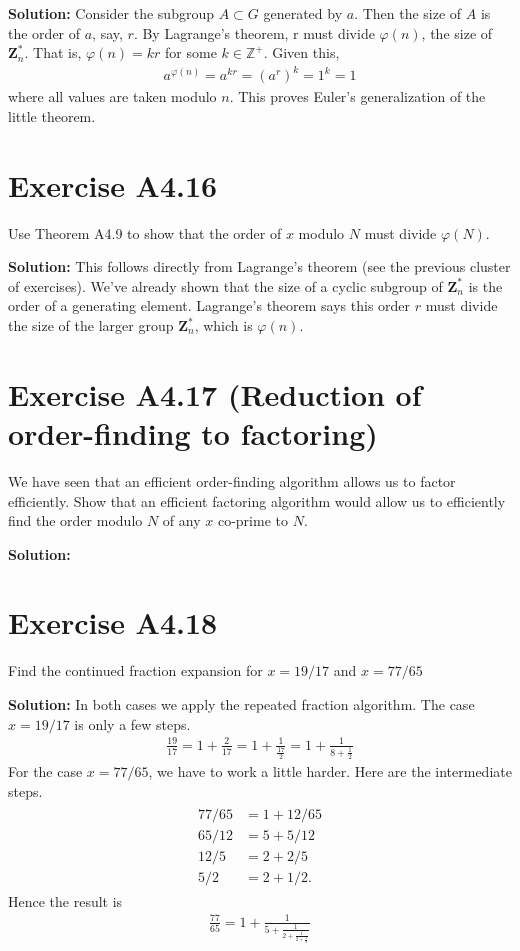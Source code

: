 \documentclass{book}
\begin{document}
    \textbf{Solution:} Consider the subgroup $A\subset G$ generated by $a$. Then the size of $A$ is the order of $a$, say, $r$. By Lagrange's theorem, r must divide $\varphi(n)$, the size of $\textbf{Z}_n^*$. That is, $\varphi(n) = k r$ for some $k\in\mathbb{Z}^+$. Given this,
    \begin{align}
        a^{\varphi(n)} = a^{kr} = (a^r)^k = 1^k = 1
    \end{align}
    where all values are taken modulo $n$. This proves Euler's generalization of the little theorem.

\section*{Exercise A4.16}
    Use Theorem A4.9 to show that the order of $x$ modulo $N$ must divide $\varphi(N)$.
    
    \textbf{Solution:} This follows directly from Lagrange's theorem (see the previous cluster of exercises). We've already shown that the size of a cyclic subgroup of $\textbf{Z}_n^*$ is the order of a generating element. Lagrange's theorem says this order $r$ must divide the size of the larger group $\textbf{Z}_n^*$, which is $\varphi(n)$.

\section*{Exercise A4.17 (Reduction of order-finding to factoring)}
    We have seen that an efficient order-finding algorithm allows us to factor efficiently. Show that an efficient factoring algorithm would allow us to efficiently find the order modulo $N$ of any $x$ co-prime to $N$.
    
    \textbf{Solution:}

\section*{Exercise A4.18}
    Find the continued fraction expansion for $x=19/17$ and $x=77/65$

    \textbf{Solution:} In both cases we apply the repeated fraction algorithm. The case $x=19/17$ is only a few steps.
    \begin{align}
        \frac{19}{17} = 1 + \frac{2}{17} = 1 + \frac{1}{\frac{17}{2}} = 1+\frac{1}{8+\frac{1}{2}} 
    \end{align}
    For the case $x=77/65$, we have to work a little harder. Here are the intermediate steps.
    \begin{align}
    \begin{aligned}
        77/65 &= 1 + 12/65 \\
        65/12 &= 5 + 5/12 \\
        12/5 &= 2 + 2/5 \\
        5/2 &= 2 + 1/2.
    \end{aligned}
    \end{align}
    Hence the result is
    \begin{align}
        \frac{77}{65} = 1 + \frac{1}{5 + \frac{1}{2+\frac{1}{2+\frac{1}{2}}}}
    \end{align}
\end{document}
